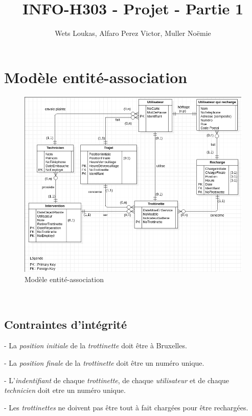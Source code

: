\documentclass{article}
\title{INFO-H303 - Projet - Partie 1}
\author{Wets Loukas, Alfaro Perez Victor, Muller Noëmie}
\begin{document}
\maketitle

\renewcommand{\abstractname}{}


\section{Modèle entité-association}


\begin{figure}[hb]
\begin{center}
\includegraphics[scale=0.4]{image.png} 
\end{center}
\caption{Modèle entité-association}
\end{figure}
\
\subsection*{Contraintes d'intégrité}

- La \textit{position initiale} de la \textit{trottinette} doit être à Bruxelles.

- La \textit{position finale} de la \textit{trottinette} doit être un numéro unique.

- L'\textit{indentifiant} de chaque \textit{trottinette}, de chaque \textit{utilisateur} et de chaque \textit{technicien} doit etre un numéro unique.

- Les \textit{trottinettes} ne doivent pas être tout à fait chargées pour être rechargées.
\end{document}
